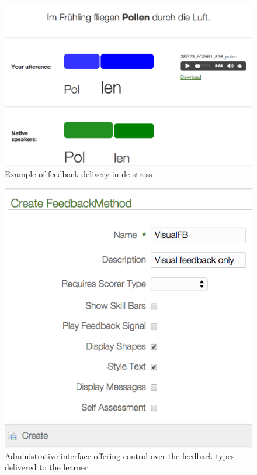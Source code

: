 \documentclass[a4paper]{article}
\begin{document}
	\begin{figure}[h!]
		\centering
		\includegraphics[width=\columnwidth]{../../img/screenshots/graphicalFB-weka-plusTextStyle}
		\caption{Example of feedback delivery in de-stress}
		\label{fig:interface:student}
	\end{figure}
	
		\begin{figure}[h!]
		\centering
		\includegraphics[width=.78\columnwidth]{FeedbackMethod}
		\caption{Administrative interface offering control over the feedback types delivered to the learner.}
		\label{fig:interface:admin}
	\end{figure}
	
\end{document}
